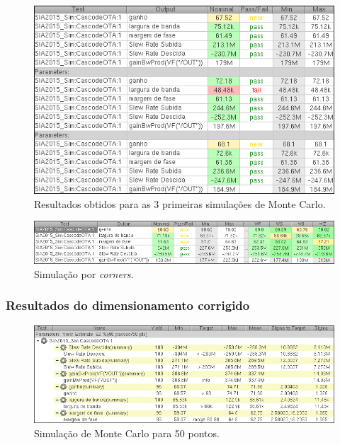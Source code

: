 \documentclass[11pt]{article}
\numberwithin{equation}{section}
\begin{document}
\begin{figure}[H]
	\centering
	\includegraphics[keepaspectratio=true, scale=0.65]{exps/MonteCarlo_3pt_Antigo}
	\vspace{-0.5em}
	\caption{Resultados obtidos para as 3 primeiras simulações de Monte Carlo.}
	\vspace{-0.8em}
\end{figure} 

\begin{figure}[H]
	\centering
	\includegraphics[keepaspectratio=true, scale=0.65]{exps/Corners_Antigo}
	\vspace{-0.5em}
	\caption{Simulação por \textit{corners}.}
	\vspace{-0.8em}
\end{figure} 

\subsubsection{Resultados do dimensionamento corrigido} 

\begin{figure}[H]
	\centering
	\includegraphics[keepaspectratio=true, scale=0.65]{exps/MonteCarlo_50pt_Novo}
	\vspace{-0.5em}
	\caption{Simulação de Monte Carlo para 50 pontos.}
	\vspace{-0.8em}
\end{figure} 
\end{document}
